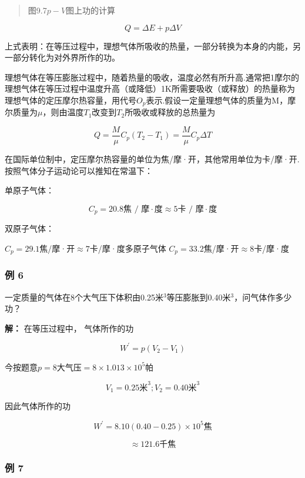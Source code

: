 \begin{quote}
图9.7\(p - V\)图上功的计算
\end{quote}

\[
Q = \Delta E + p \Delta V \tag {9.8}
\]

上式表明：在等压过程中，理想气体所吸收的热量，一部分转换为本身的内能，另一部分转化为对外界所作的功。

理想气体在等压膨胀过程中，随着热量的吸收，温度必然有所升高.通常把1摩尔的理想气体在等压过程中温度升高（或降低）1K所需要吸收（或释放）的热量称为理想气体的定压摩尔热容量，用代号\(O_{p}\)表示.假设一定量理想气体的质量为M，摩尔质量为\(\mu\)，则由温度\(T_{1}\)改变到\(T_{2}\)所吸收或释放的总热量为

\[
Q = \frac {M}{\mu} C _ {p} (T _ {2} - T _ {1}) = \frac {M}{\mu} C _ {p} \Delta T \tag {9.9}
\]

在国际单位制中，定压摩尔热容量的单位为焦/摩·开，其他常用单位为卡/摩·开.按照气体分子运动论可以推知在常温下：

单原子气体：

\[
C _ {p} = 20.8 \text{焦   /   摩} \cdot \text{度} \approx 5 \text{卡   /   摩} \cdot \text{度}
\]

双原子气体：

\(C_{p}=29.1\)焦/摩·开\(\approx7\)卡/摩·度多原子气体
\(C_{p}=33.2\)焦/摩·开\(\approx8\)卡/摩·度

\subsubsection{例 6}\label{ux4f8b-6-4}

一定质量的气体在8个大气压下体积由0.25米\(^{3}\)等压膨胀到0.40米\(^{3}\)，问气体作多少功？

\textbf{解：} 在等压过程中， 气体所作的功

\[
W ^ {\prime} = p (V _ {2} - V _ {1})
\]

今按题意\(p = 8\)大气压\(= 8 \times 1.013 \times 10^{5}\)帕

\[
V _ {1} = 0.25 \text{米} ^ {3}; V _ {2} = 0.40 \text{米} ^ {3}
\]

因此气体所作的功

\[
W ^ {\prime} = 8.10 (0.40 - 0.25) \times 10 ^ {5} \text{焦}
\]

\[
\approx 121.6 \text{千焦}
\]

\subsubsection{例 7}\label{ux4f8b-7-4}

